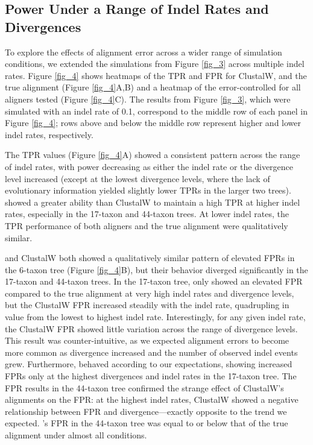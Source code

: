 \documentclass{article}
\begin{document}
\subsection*{\Sw Power Under a Range of Indel Rates and Divergences}

To explore the effects of alignment error across a wider range of
simulation conditions, we extended the simulations from Figure
\ref{fig_3} across multiple indel rates. Figure \ref{fig_4} shows
heatmaps of the TPR and FPR for ClustalW, \prankc and the true
alignment (Figure \ref{fig_4}A,B) and a heatmap of the
error-controlled \tpr for all aligners tested (Figure
\ref{fig_4}C). The results from Figure \ref{fig_3}, which were
simulated with an indel rate of 0.1, correspond to the middle row of
each panel in Figure \ref{fig_4}; rows above and below the middle row
represent higher and lower indel rates, respectively.

The TPR values (Figure \ref{fig_4}A) showed a consistent pattern
across the range of indel rates, with power decreasing as either the
indel rate or the divergence level increased (except at the lowest
divergence levels, where the lack of evolutionary information yielded
slightly lower TPRs in the larger two trees). \prankc{} showed a
greater ability than ClustalW to maintain a high TPR at higher indel
rates, especially in the 17-taxon and 44-taxon trees. At lower indel
rates, the TPR performance of both aligners and the true alignment
were qualitatively similar.

\prankc{} and ClustalW both showed a qualitatively similar pattern of
elevated FPRs in the 6-taxon tree (Figure \ref{fig_4}B), but their
behavior diverged significantly in the 17-taxon and 44-taxon trees. In
the 17-taxon tree, \prankc{} only showed an elevated FPR compared to
the true alignment at very high indel rates and divergence levels, but
the ClustalW FPR increased steadily with the indel rate, quadrupling
in value from the lowest to highest indel rate. Interestingly, for any
given indel rate, the ClustalW FPR showed little variation across the
range of divergence levels. This result was counter-intuitive, as we
expected alignment errors to become more common as divergence
increased and the number of observed indel events grew. Furthermore,
\prankc{} behaved according to our expectations, showing increased
FPRs only at the highest divergences and indel rates in the 17-taxon
tree. The FPR results in the 44-taxon tree confirmed the strange
effect of ClustalW’s alignments on the \sw FPR: at the highest indel
rates, ClustalW showed a negative relationship between FPR and
divergence---exactly opposite to the trend we expected. \prankc{}'s
FPR in the 44-taxon tree was equal to or below that of the true
alignment under almost all conditions.
\end{document}
